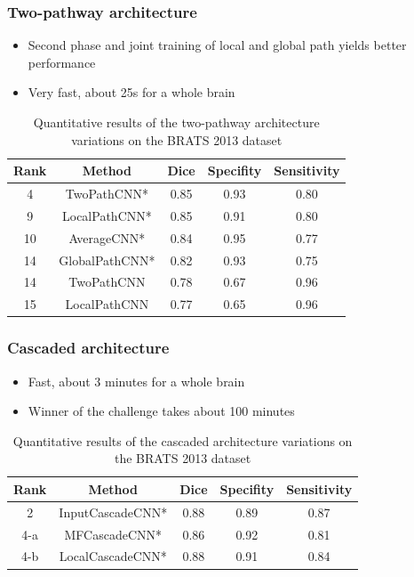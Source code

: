 \documentclass[aspectratio=43, notes]{beamer} 	%
\begin{document}
\begin{frame}
	\frametitle<presentation>{Two-pathway architecture}
	\begin{itemize}
		\item Second phase and joint training of local and global path yields better performance
		\item Very fast, about 25s for a whole brain
	\end{itemize}
	\begin{table}
		\caption{Quantitative results of the two-pathway architecture variations on the BRATS 2013 dataset}
		\label{tab:beispiel}
		\centering
			\begin{tabular}{ccccc}
				\toprule
				Rank & Method & Dice & Specifity & Sensitivity \\
				\midrule
				4 	& TwoPathCNN* 		& 0.85	& 0.93	& 0.80\\
				9 	& LocalPathCNN* 		& 0.85	& 0.91	& 0.80\\
				10 	& AverageCNN* 		& 0.84	& 0.95	& 0.77\\
				14 	& GlobalPathCNN* 	& 0.82	& 0.93	& 0.75\\
				14 	& TwoPathCNN 		& 0.78	& 0.67	& 0.96\\
				15 	& LocalPathCNN		& 0.77	& 0.65	& 0.96\\
				\bottomrule
			\end{tabular}
	\end{table}
\end{frame}

\begin{frame}
	\frametitle<presentation>{Cascaded architecture}
	\begin{itemize}
		\item Fast, about 3 minutes for a whole brain
		\item Winner of the challenge takes about 100 minutes
	\end{itemize}
	\begin{table}
		\caption{Quantitative results of the cascaded architecture variations on the BRATS 2013 dataset}
		\label{tab:beispiel}
		\centering
			\begin{tabular}{ccccc}
				\toprule
				Rank & Method & Dice & Specifity & Sensitivity \\
				\midrule
				2 	& InputCascadeCNN*	& 0.88	& 0.89	& 0.87\\
				4-a & MFCascadeCNN* 		& 0.86	& 0.92	& 0.81\\
				4-b & LocalCascadeCNN* 	& 0.88	& 0.91	& 0.84\\
				\bottomrule
			\end{tabular}
	\end{table}
\end{frame}
\end{document}
